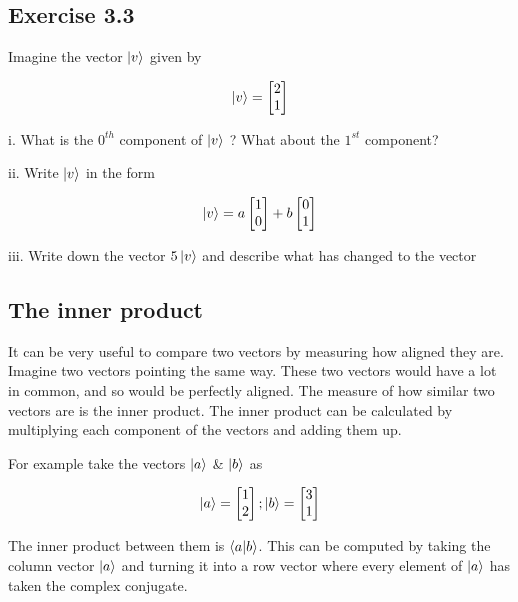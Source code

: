 \documentclass{book}
\begin{document}
\subsection{Exercise 3.3}

Imagine the vector $\ket{v}$ given by 

$$\ket{v} = \begin{bmatrix} 2 \\ 1 \end{bmatrix}$$

i. What is the $0^{th}$ component of $\ket{v}$ ? What about the $1^{st}$ component?

ii. Write $\ket{v}$ in the form 

$$
\ket{v} = a\begin{bmatrix} 1 \\ 0 \end{bmatrix} + b \begin{bmatrix} 0 \\ 1 \end{bmatrix}
$$

iii. Write down the vector $5\ket{v}$ and describe what has changed to the vector  

\hline
\subsection{The inner product}

It can be very useful to compare two vectors by measuring how aligned they are. Imagine two vectors pointing the same way. These two vectors would have a lot in common, and so would be perfectly aligned. The measure of how similar two vectors are is the inner product. The inner product can be calculated by multiplying each component of the vectors and adding them up. 

For example take the vectors $\ket{a}$ \& $\ket{b}$ as 

 $$
 \ket{a} = \begin{bmatrix} 1 \\ 2 \end{bmatrix} ;  \ket{b} = \begin{bmatrix} 3 \\ 1 \end{bmatrix} 
 $$

 The inner product between them is $\braket{a|b}$. This can be computed by taking the column vector $\ket{a}$ and turning it into a row vector where every element of $\ket{a}$ has taken the complex conjugate. 
\end{document}
